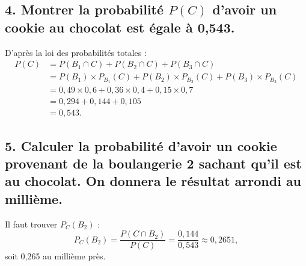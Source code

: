 \documentclass[10pt]{article}
\begin{document}
	\subsection*{4. Montrer la probabilité \(P(C)\) d’avoir un cookie au chocolat est égale à 0,543.}
	
	D’après la loi des probabilités totales :
	\begin{align*}
		P(C) &= P(B_1 \cap C) + P(B_2 \cap C) + P(B_3 \cap C)\\
		& = P(B_1) \times P_{B_1}(C) + P(B_2) \times P_{B_2}(C) + P(B_3) \times P_{B_3}(C) \\
		& = 0,49 \times 0,6 + 0,36 \times 0,4 + 0,15 \times 0,7 \\
	& = 0,294 + 0,144 + 0,105 \\
	&= 0,543. 
	\end{align*}
	
	\subsection*{5. Calculer la probabilité d’avoir un cookie provenant de la boulangerie 2 sachant qu’il est au chocolat. On donnera le résultat arrondi au millième.}
	
	Il faut trouver \(P_C(B_2)\) :
	\[ P_C(B_2) = \dfrac{P(C \cap B_2)}{P(C)} = \dfrac{0,144}{0,543} \approx 0,2651, \]
	soit 0,265 au millième près.
\end{document}
